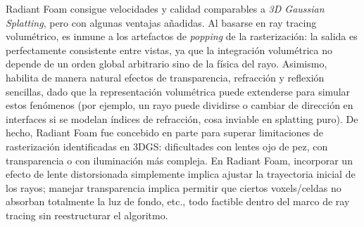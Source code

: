 Radiant Foam consigue velocidades y calidad comparables a \textit{3D Gaussian Splatting}, pero con algunas ventajas añadidas. Al basarse en ray tracing volumétrico, es inmune a los artefactos de \textit{popping} de la rasterización: la salida es perfectamente consistente entre vistas, ya que la integración volumétrica no depende de un orden global arbitrario sino de la física del rayo. Asimismo, habilita de manera natural efectos de transparencia, refracción y reflexión sencillas, dado que la representación volumétrica puede extenderse para simular estos fenómenos (por ejemplo, un rayo puede dividirse o cambiar de dirección en interfaces si se modelan índices de refracción, cosa inviable en splatting puro). De hecho, Radiant Foam fue concebido en parte para superar limitaciones de rasterización identificadas en 3DGS: dificultades con lentes ojo de pez, con transparencia o con iluminación más compleja. En Radiant Foam, incorporar un efecto de lente distorsionada simplemente implica ajustar la trayectoria inicial de los rayos; manejar transparencia implica permitir que ciertos voxels/celdas no absorban totalmente la luz de fondo, etc., todo factible dentro del marco de ray tracing sin reestructurar el algoritmo.
